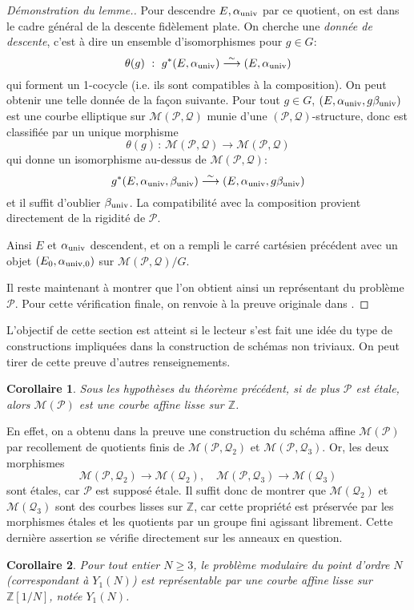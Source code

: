 \documentclass[11pt,a4paper]{article}
\newcommand{\Z}{\mathbb{Z}}
\renewcommand{\Pr}{\mathcal{P}}
\newcommand{\Qr}{\mathcal{Q}}
\newcommand{\M}{\mathcal{M}}
\newcommand{\vers}{\longrightarrow}
\newcommand{\de}{\,:\,}
\renewcommand{\v}{\vspace{5mm}}
\newtheorem*{cor}{Corollaire}
\theoremstyle{definition}
\begin{document}
\begin{proof}[Démonstration du lemme.]
Pour descendre $E, \alpha_{\mathrm{univ}}$ par ce quotient, on est dans le cadre général de la descente fidèlement plate. On cherche une \emph{donnée de descente}, c'est à dire un ensemble d'isomorphismes pour $g\in G$:
$$\theta(g)\ :\ g^*(E, \alpha_{\univ}) \overset{\sim}{\vers} (E, \alpha_{\univ})$$
qui forment un 1-cocycle (i.e. ils sont compatibles à la composition). On peut obtenir une telle donnée de la façon suivante. Pour tout $g\in G$, $(E, \alpha_{\mathrm{univ}}, g\beta_{\mathrm{univ}})$ est une courbe elliptique sur $\M(\Pr, \Qr)$ munie d'une $(\Pr,\Qr)$-structure, donc est classifiée par un unique morphisme
$$\theta(g) \de \M(\Pr,\Qr)\vers \M(\Pr,\Qr)$$
qui donne un isomorphisme au-dessus de $\M(\Pr,\Qr)$:
$$g^*(E, \alpha_\univ, \beta_\univ) \overset{\sim}{\vers} (E, \alpha_\univ, g\beta_\univ)$$
et il suffit d'oublier $\beta_{\mathrm{univ}}$. La compatibilité avec la composition provient directement de la rigidité de $\Pr$.

Ainsi $E$ et $\alpha_{\mathrm{univ}}$ descendent, et on a rempli le carré cartésien précédent avec un objet $(E_0,\alpha_{\mathrm{univ}, 0})$ sur $\M(\Pr,\Qr)/G$.

Il reste maintenant à montrer que l'on obtient ainsi un représentant du problème $\Pr$. 
Pour cette vérification finale, on renvoie à la preuve originale dans \cite{KaMa}.

\end{proof}

\v

L'objectif de cette section est atteint si le lecteur s'est fait une idée du type de constructions impliquées dans la construction de schémas \og non triviaux\fg. On peut tirer de cette preuve d'autres renseignements.

\begin{cor}
Sous les hypothèses du théorème précédent, si de plus $\Pr$ est étale, alors $\M(\Pr)$ est une courbe affine lisse sur $\Z$.
\end{cor}
En effet, on a obtenu dans la preuve une construction du schéma affine $\M(\Pr)$ par recollement de quotients finis de $\M(\Pr, \Qr_2)$ et $\M(\Pr, \Qr_3)$. Or, les deux morphismes
$$\M(\Pr, \Qr_2)\vers \M(\Qr_2),\quad \M(\Pr, \Qr_3)\vers \M(\Qr_3)$$
sont étales, car $\Pr$ est supposé étale. Il suffit donc de montrer que $\M(\Qr_2)$ et $\M(\Qr_3)$ sont des courbes lisses sur $\Z$, car cette propriété est préservée par les morphismes étales et les quotients par un groupe fini agissant librement. Cette dernière assertion se vérifie directement sur les anneaux en question.

\begin{cor}
Pour tout entier $N\geq 3$, le problème modulaire du point d'ordre $N$ (correspondant à $Y_1(N)$) est représentable par une courbe affine lisse sur $\Z[1/N]$, notée $Y_1(N)$.
\end{cor}
\end{document}
